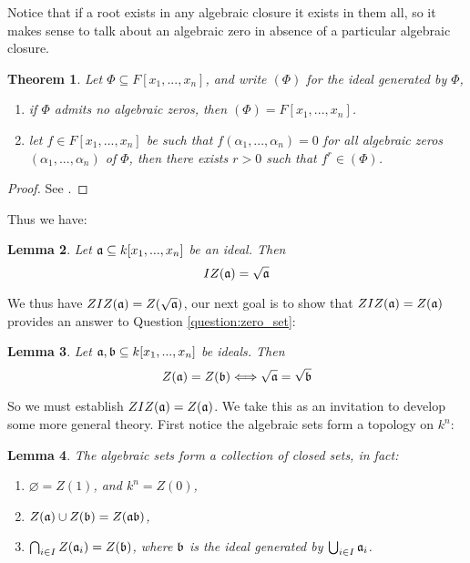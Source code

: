 \documentclass[12pt]{article}
\theoremstyle{plain}
\newtheorem{thm}{Theorem}[subsection] %
\newtheorem{lemma}[thm]{Lemma}
\theoremstyle{definition}
\begin{document}
Notice that if a root exists in any algebraic closure it exists in them all, so it makes sense to talk about an algebraic zero in absence of a particular algebraic closure.
\begin{thm}
\label{thm:hilbertsnullstellensatz}
Let $\Phi \subseteq F[x_1,...,x_n]$, and write $(\Phi)$ for the ideal generated by $\Phi$,
\begin{enumerate}
    \item\label{generates} if $\Phi$ admits no algebraic zeros, then $(\Phi) = F[x_1,...,x_n]$.
    \item\label{power} let $f \in F[x_1,...,x_n]$ be such that $f(\alpha_1,...,\alpha_n) = 0$ for all algebraic zeros $(\alpha_1,...,\alpha_n)$ of $\Phi$, then there exists $r > 0$ such that $f^r \in (\Phi)$.
\end{enumerate}
\end{thm}
\begin{proof}
See \cite{algebra}.
\end{proof}
Thus we have:
\begin{lemma}
Let $\frak{a} \subseteq k[x_1,...,x_n]$ be an ideal. Then
\begin{equation}\label{eq:IZ}
    IZ(\frak{a}) = \sqrt{\frak{a}}
\end{equation}
\end{lemma}
We thus have $ZIZ(\frak{a}) = Z(\sqrt{\frak{a}})$, our next goal is to show that $ZIZ(\frak{a}) = Z(\frak{a})$ provides an answer to Question \ref{question:zero_set}:
\begin{lemma}
Let $\frak{a},\frak{b} \subseteq k[x_1,...,x_n]$ be ideals. Then
\begin{equation}
    Z(\frak{a}) = Z(\frak{b}) \Longleftrightarrow \sqrt{\frak{a}} = \sqrt{\frak{b}}
\end{equation}
\end{lemma}
So we must establish $ZIZ(\frak{a}) = Z(\frak{a})$. We take this as an invitation to develop some more general theory. First notice the algebraic sets form a topology on $k^n$:
\begin{lemma}
The algebraic sets form a collection of closed sets, in fact:
\begin{enumerate}
    \item $\varnothing = Z(1)$, and $k^n = Z(0)$,
    \item $Z(\frak{a}) \cup Z(\frak{b}) = Z(\frak{a}\frak{b})$,
    \item $\bigcap_{i \in I}Z(\frak{a}_i) = Z(\frak{b})$, where $\frak{b}$ is the ideal generated by $\bigcup_{i \in I}\frak{a}_i$.
\end{enumerate}
\end{lemma}
\end{document}

